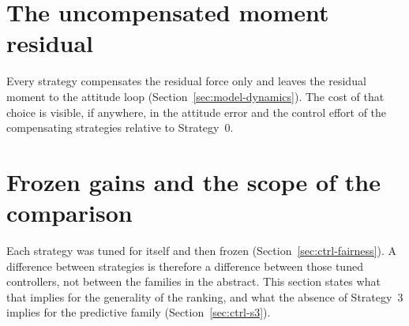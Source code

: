 
\section{The uncompensated moment residual}
\label{sec:disc-moment}

Every strategy compensates the residual force only and leaves the residual moment to the attitude
loop (Section~\ref{sec:model-dynamics}). The cost of that choice is visible, if anywhere, in the
attitude error and the control effort of the compensating strategies relative to Strategy~0.


\section{Frozen gains and the scope of the comparison}
\label{sec:disc-frozen}

Each strategy was tuned for itself and then frozen (Section~\ref{sec:ctrl-fairness}). A difference
between strategies is therefore a difference between those tuned controllers, not between the
families in the abstract. This section states what that implies for the generality of the ranking,
and what the absence of Strategy~3 implies for the predictive family (Section~\ref{sec:ctrl-s3}).

